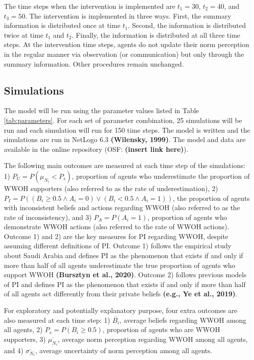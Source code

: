 \documentclass[
  11pt,
]{article}
\begin{document}
The time steps when the intervention is implemented are \(t_1 = 30\),
\(t_2 = 40\), and \(t_3 = 50\). The intervention is implemented in three
ways. First, the summary information is distributed once at time
\(t_1\). Second, the information is distributed twice at time \(t_1\)
and \(t_2\). Finally, the information is distributed at all three time
steps. At the intervention time steps, agents do not update their norm
perception in the regular manner via observation (or communication) but
only through the summary information. Other procedures remain unchanged.

\hypertarget{simulations}{%
\subsection{Simulations}\label{simulations}}

The model will be run using the parameter values listed in Table
\ref{tab:parameters}. For each set of parameter combination, 25
simulations will be run and each simulation will run for 150 time steps.
The model is written and the simulations are run in NetLogo 6.3
\textbf{(Wilensky, 1999)}. The model and data are available in the
online repository (OSF: \textbf{(insert link here)}).

The following main outcomes are measured at each time step of the
simulations: 1) \(P_U = P(\mu_{N_i} < P_s)\), proportion of agents who
underestimate the proportion of WWOH supporters (also referred to as the
rate of underestimation), 2)
\(P_I = P((B_i \ge 0.5 \wedge A_i = 0) \vee (B_i < 0.5 \wedge A_i = 1))\),
the proportion of agents with inconsistent beliefs and actions regarding
WWOH (also referred to as the rate of inconsistency), and 3)
\(P_A = P(A_i = 1)\), proportion of agents who demonstrate WWOH actions
(also referred to the rate of WWOH actions). Outcome 1) and 2) are the
key measures for PI regarding WWOH, despite assuming different
definitions of PI. Outcome 1) follows the empirical study about Saudi
Arabia and defines PI as the phenomenon that exists if and only if more
than half of all agents underestimate the true proportion of agents who
support WWOH \textbf{(Bursztyn et al., 2020)}. Outcome 2) follows
previous models of PI and defines PI as the phenomenon that exists if
and only if more than half of all agents act differently from their
private beliefs \textbf{(e.g., Ye et al., 2019)}.

For exploratory and potentially explanatory purpose, four extra outcomes
are also measured at each time step: 1) \(\overline{B_i}\), average
beliefs regarding WWOH among all agents, 2) \(P_s = P(B_i \ge 0.5)\),
proportion of agents who are WWOH supporters, 3)
\(\overline{\mu_{N_i}}\), average norm perception regarding WWOH among
all agents, and 4) \(\overline{\sigma_{N_i}}\), average uncertainty of
norm perception among all agents.
\end{document}
